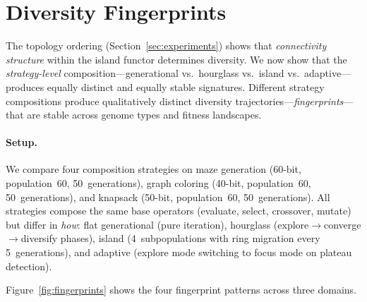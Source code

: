 \documentclass[dvipsnames,format=sigconf,anonymous=false,review=false]{acmart}
\begin{document}
\section{Diversity Fingerprints}
\label{sec:fingerprints}

The topology ordering (Section~\ref{sec:experiments}) shows that \emph{connectivity structure} within the island functor determines diversity. We now show that the \emph{strategy-level} composition---generational vs.\ hourglass vs.\ island vs.\ adaptive---produces equally distinct and equally stable signatures. Different strategy compositions produce qualitatively distinct diversity trajectories---\emph{fingerprints}---that are stable across genome types and fitness landscapes.

\paragraph{Setup.}
\label{sec:fingerprint-setup}
We compare four composition strategies on maze generation (60-bit, population~60, 50~generations), graph coloring (40-bit, population~60, 50~generations), and knapsack (50-bit, population~60, 50~generations). All strategies compose the same base operators (evaluate, select, crossover, mutate) but differ in \emph{how}: flat generational (pure iteration), hourglass (explore$\to$converge$\to$diversify phases), island (4~subpopulations with ring migration every 5~generations), and adaptive (explore mode switching to focus mode on plateau detection).

Figure~\ref{fig:fingerprints} shows the four fingerprint patterns across three domains.
\end{document}
